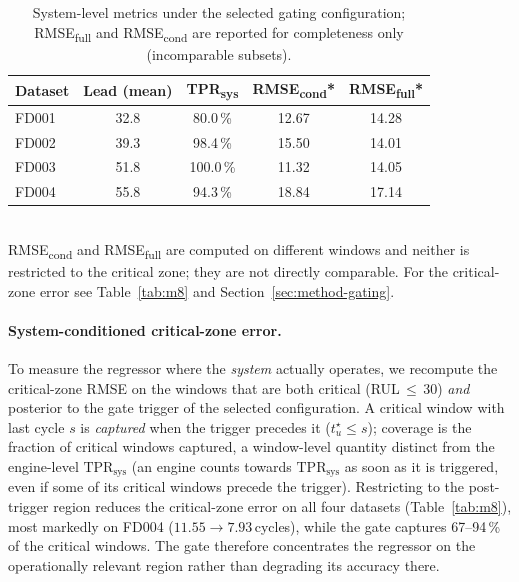 \documentclass[5p,times,authoryear]{elsarticle}
\begin{document}
\begin{table}[!t]
\centering
\caption{System-level metrics under the selected gating configuration; RMSE\textsubscript{full} and RMSE\textsubscript{cond} are reported for completeness only (incomparable subsets).}
\label{tab:gating-system}
\small
\begin{tabular}{lcccc}
\toprule
Dataset & Lead (mean) & TPR\textsubscript{sys} & RMSE\textsubscript{cond}* & RMSE\textsubscript{full}* \\
\midrule
FD001 & 32.8 & 80.0\,\%  & 12.67 & 14.28 \\
FD002 & 39.3 & 98.4\,\%  & 15.50 & 14.01 \\
FD003 & 51.8 & 100.0\,\% & 11.32 & 14.05 \\
FD004 & 55.8 & 94.3\,\%  & 18.84 & 17.14 \\
\bottomrule
\end{tabular}
\\[2pt]
\footnotesize *RMSE\textsubscript{cond} and RMSE\textsubscript{full} are computed on different windows and neither is restricted to the critical zone; they are not directly comparable. For the critical-zone error see Table~\ref{tab:m8} and Section~\ref{sec:method-gating}.
\end{table}

\paragraph{System-conditioned critical-zone error.} To measure the regressor where the \emph{system} actually operates, we recompute the critical-zone RMSE on the windows that are both critical (RUL\,$\le$\,30) \emph{and} posterior to the gate trigger of the selected configuration. A critical window with last cycle $s$ is \emph{captured} when the trigger precedes it ($t^\star_u\le s$); coverage is the fraction of critical windows captured, a window-level quantity distinct from the engine-level $\mathrm{TPR}_{\mathrm{sys}}$ (an engine counts towards $\mathrm{TPR}_{\mathrm{sys}}$ as soon as it is triggered, even if some of its critical windows precede the trigger). Restricting to the post-trigger region reduces the critical-zone error on all four datasets (Table~\ref{tab:m8}), most markedly on FD004 ($11.55\rightarrow 7.93$\,cycles), while the gate captures 67--94\,\% of the critical windows. The gate therefore concentrates the regressor on the operationally relevant region rather than degrading its accuracy there.
\end{document}
